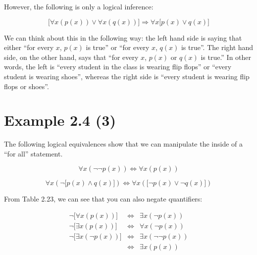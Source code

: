 \documentclass{article}
\begin{document}
However, the following is only a logical inference:

\[
\lbrack\forall x(p(x))\vee \forall x(q(x))\rbrack \Rightarrow \forall x\lbrack p(x)\vee q(x)\rbrack
\]

We can think about this in the following way: the left hand side is
saying that either ``for every $x$, $p(x)$ is true'' or ``for every
$x$, $q(x)$ is true''. The right hand side, on the other hand, says
that ``for every $x$, $p(x)$ or $q(x)$ is true.'' In other words, the
left is ``every student in the class is wearing flip flops'' or
``every student is wearing shoes'', whereas the right side is ``every
student is wearing flip flops or shoes''.

\section*{Example 2.4 (3)}

The following logical equivalences show that we can manipulate the
inside of a ``for all'' statement.

\[
\forall x (\neg\neg p(x)) \Leftrightarrow \forall x(p(x))
\]

\[
\forall x(\neg\lbrack p(x)\wedge q(x)\rbrack) \Leftrightarrow \forall x(\lbrack\neg p(x)\vee \neg q(x)\rbrack)
\]

From Table 2.23, we can see that you can also negate quantifiers:

\[
\begin{array}{rcl}
\neg\lbrack\forall x(p(x))\rbrack & \Leftrightarrow & \exists x(\neg p(x)) \\
\neg\lbrack\exists x(p(x))\rbrack & \Leftrightarrow & \forall x(\neg p(x)) \\
\neg\lbrack\exists x(\neg p(x))\rbrack & \Leftrightarrow & \exists x(\neg\neg p(x)) \\
                                       & \Leftrightarrow & \exists x(p(x)) \\
\end{array}
\]
\end{document}
